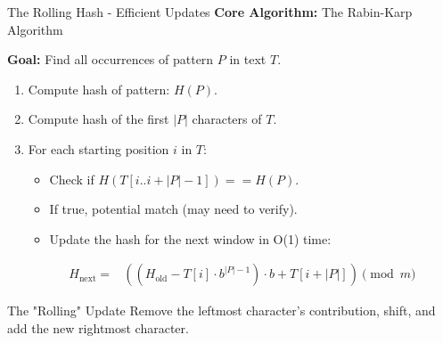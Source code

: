 \documentclass{beamer}
\begin{document}
\begin{frame}{The Rolling Hash - Efficient Updates}
    \textbf{Core Algorithm:} The Rabin-Karp Algorithm

    \textbf{Goal:} Find all occurrences of pattern \alert{$P$} in text \alert{$T$}.

    \begin{enumerate}
        \item Compute hash of pattern: $H(P)$.
        \item Compute hash of the first $|P|$ characters of $T$.
        \item For each starting position $i$ in $T$:
            \begin{itemize}
                \item Check if $H(T[i..i+|P|-1]) == H(P)$.
                \item If true, \alert{potential match} (may need to verify).
                \item Update the hash for the \alert{next window} in O(1) time:
            \end{itemize}
            \begin{align*}
                H_{\text{next}} = &\left( (H_{\text{old}} - T[i] \cdot b^{|P|-1}) \cdot b + T[i+|P|] \right) \pmod{m}
            \end{align*}
    \end{enumerate}

    \begin{block}{The "Rolling" Update}
        Remove the leftmost character's contribution, shift, and add the new rightmost character.
    \end{block}
\end{frame}
\end{document}
